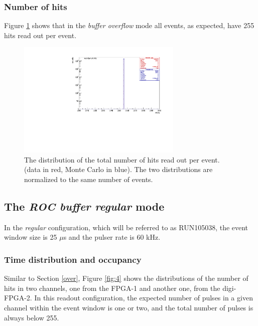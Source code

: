 \subsubsection{Number of hits}
Figure \ref{fig:3} shows that in the \textit{buffer overflow} mode all events,
as expected, have 255 hits read out per event.

\begin{figure}[!h]
\centering
\includegraphics[width =0.7\textwidth]{figures/pdf/figure_00008_nhits_281.pdf}
\caption{
  The distribution of the total number of hits read out per event. 
  (data in red, Monte Carlo in blue). The two distributions 
  are normalized to the same number of events.
}
\label{fig:3}
\end{figure}
\subsection{The \textit{ROC buffer regular} mode }
In the \textit{regular} configuration, which will be referred to as RUN105038, the event window size is 25 $\mu$s
and the pulser rate is 60 kHz.

\subsubsection{Time distribution and occupancy}

Similar to Section \ref{over}, Figure \ref{fig:4} shows the distributions
of the number of hits in two channels, one from the 
FPGA-1 and another one, from the digi-FPGA-2. 
In this readout configuration, the expected number of pulses in a given channel
within the event window is one or two, and the total number of pulses is always below 255.

